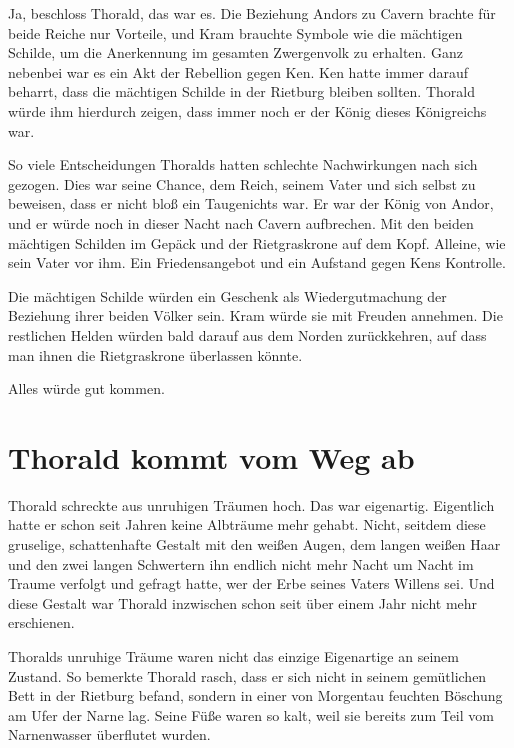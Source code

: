 Ja, beschloss Thorald, das war es. Die Beziehung Andors zu Cavern brachte für beide Reiche nur Vorteile, und Kram brauchte Symbole wie die mächtigen Schilde, um die Anerkennung im gesamten Zwergenvolk zu erhalten. Ganz nebenbei war es ein Akt der Rebellion gegen Ken. Ken hatte immer darauf beharrt, dass die mächtigen Schilde in der Rietburg bleiben sollten. Thorald würde ihm hierdurch zeigen, dass immer noch er der König dieses Königreichs war.

So viele Entscheidungen Thoralds hatten schlechte Nachwirkungen nach sich gezogen. Dies war seine Chance, dem Reich, seinem Vater und sich selbst zu beweisen, dass er nicht bloß ein Taugenichts war. Er war der König von Andor, und er würde noch in dieser Nacht nach Cavern aufbrechen. Mit den beiden mächtigen Schilden im Gepäck und der Rietgraskrone auf dem Kopf. Alleine, wie sein Vater vor ihm. Ein Friedensangebot und ein Aufstand gegen Kens Kontrolle.

Die mächtigen Schilde würden ein Geschenk als Wiedergutmachung der Beziehung ihrer beiden Völker sein. Kram würde sie mit Freuden annehmen. Die restlichen Helden würden bald darauf aus dem Norden zurückkehren, auf dass man ihnen die Rietgraskrone überlassen könnte.

Alles würde gut kommen.








\newpage
\section{Thorald kommt vom Weg ab}


Thorald schreckte aus unruhigen Träumen hoch. Das war eigenartig. Eigentlich hatte er schon seit Jahren keine Albträume mehr gehabt. Nicht, seitdem diese gruselige, schattenhafte Gestalt mit den weißen Augen, dem langen weißen Haar und den zwei langen Schwertern ihn endlich nicht mehr Nacht um Nacht im Traume verfolgt und gefragt hatte, wer der Erbe seines Vaters Willens sei. Und diese Gestalt war Thorald inzwischen schon seit über einem Jahr nicht mehr erschienen.

Thoralds unruhige Träume waren nicht das einzige Eigenartige an seinem Zustand. So bemerkte Thorald rasch, dass er sich nicht in seinem gemütlichen Bett in der Rietburg befand, sondern in einer von Morgentau feuchten Böschung am Ufer der Narne lag. Seine Füße waren so kalt, weil sie bereits zum Teil vom Narnenwasser überflutet wurden.

